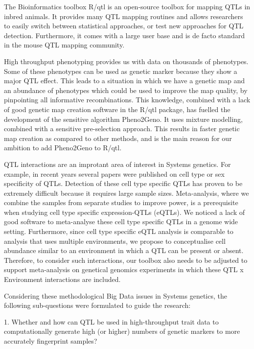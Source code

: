 The Bioinformatics toolbox R/qtl \cite{Broman:2003, Arends:2010} is an open-source toolbox for mapping QTLs in inbred 
animals. It provides many QTL mapping routines and allows researchers to easily switch between statistical approaches, 
or test new approaches for QTL detection. Furthermore, it comes with a large user base and is de facto standard in 
the mouse QTL mapping community.

High throughput phenotyping provides us with data on thousands of phenotypes. Some of these phenotypes can be used 
as genetic marker because they show a major QTL effect. This leads to a situation in which we have a genetic 
map and an abundance of phenotypes which could be used to improve the map quality, by pinpointing all informative recombinations. 
This knowledge, combined with a lack of good genetic map creation software in the R/qtl package, has fuelled the development of the sensitive algorithm 
Pheno2Geno. It uses mixture modelling, combined with a sensitive pre-selection approach. This results in faster 
genetic map creation as compared to other methods, and is the main reason for our ambition to add Pheno2Geno to R/qtl. 

QTL interactions are an improtant area of interest in Systems genetics. For example, in recent years several papers were 
published on cell type or sex specificity of QTLs. Detection of these cell type specific QTLs has proven to be extremely 
difficult because it requires large sample sizes.  Meta-analysis, where we combine the samples from separate studies 
to improve power, is a prerequisite when studying cell type specific expression-QTLs (eQTLs). We noticed a lack of 
good software to meta-analyse these cell type specific QTLs in a genome wide setting. Furthermore, since cell type specific 
eQTL analysis is comparable to analysis that uses multiple environments, we propose to conceptualise cell abundance 
similar to an environment in which a QTL can be present or absent. Therefore, to consider such interactions, our toolbox 
also needs to be adjusted to support meta-analysis on genetical genomics experiments in which these QTL x Environment 
interactions are included.

Considering these methodological Big Data issues in Systems genetics, the following sub-questions were formulated to 
guide the research: 

1. Whether and how can QTL be used in high-throughput trait data to computationally generate high (or higher) numbers of genetic markers to more accurately fingerprint samples? 

